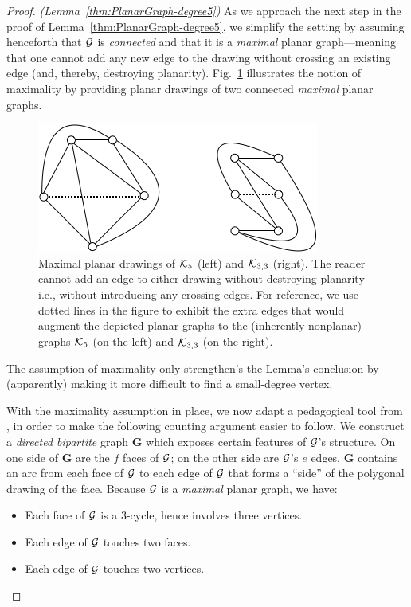 \begin{proof} {\em (Lemma~\ref{thm:PlanarGraph-degree5})}
As we approach the next step in the proof of Lemma~\ref{thm:PlanarGraph-degree5}, we  simplify the setting by assuming henceforth that $\mbox{$\cal G$}$ is {\em connected} and that it is a {\em maximal} planar graph---meaning that one cannot add any new edge to the drawing without crossing an existing edge (and, thereby, destroying planarity).  Fig.~\ref{fig:K5andK3by3} illustrates the notion 
of maximality by providing planar drawings of two connected {\em maximal} planar graphs.
\begin{figure}[hbt]
\begin{center}
       \includegraphics[scale=0.55]{FiguresGraph/K5andK3by3}
\caption{Maximal planar drawings of $\mbox{$\cal K$}_5$ (left) and $\mbox{$\cal K$}_{3,3}$ (right).  The reader cannot add an edge to either drawing without destroying planarity---i.e., without introducing any crossing edges.  For reference, we use dotted lines in the figure to exhibit the extra edges that would augment the depicted planar graphs to the (inherently nonplanar) graphs $\mbox{$\cal K$}_5$ (on the left) and $\mbox{$\cal K$}_{3,3}$ (on the right).}
  \label{fig:K5andK3by3}
\end{center}
\end{figure}
The assumption of maximality only strengthen's the Lemma's conclusion by (apparently) making it more difficult to find a small-degree vertex.


\smallskip

With the maximality assumption in place, we now adapt a pedagogical tool from \cite{Berge73}, in order to make the following counting argument easier to follow.  We construct a {\em directed bipartite} graph {\bf G} which exposes certain features of $\mbox{$\cal G$}$'s structure.  On one side of {\bf G} are the $f$ faces of $\mbox{$\cal G$}$; on the other side are $\mbox{$\cal G$}$'s $e$ edges.  {\bf G} contains an arc from each face of $\mbox{$\cal G$}$ to each edge of $\mbox{$\cal G$}$ that forms a ``side'' of the polygonal drawing of the face.  Because $\mbox{$\cal G$}$ is a {\em maximal} planar graph, we have:
\begin{itemize}
\item
Each face of $\mbox{$\cal G$}$ is a $3$-cycle, hence involves three vertices.
\item
Each edge of $\mbox{$\cal G$}$ touches two faces.
\item
Each edge of $\mbox{$\cal G$}$ touches two vertices.
\end{itemize}


\end{proof}
